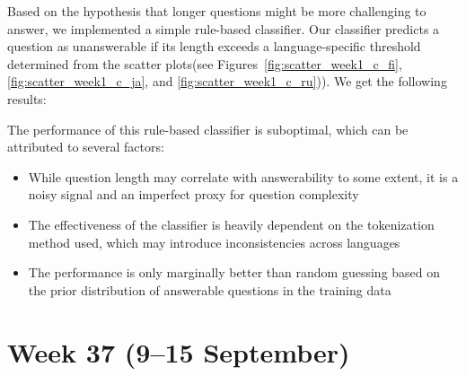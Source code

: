 \documentclass[11pt]{article}
\begin{document}
\begin{enumerate}
    Based on the hypothesis that longer questions might be more challenging to answer, we implemented a simple rule-based classifier. 
    Our classifier predicts a question as unanswerable if its length exceeds a language-specific threshold determined from the scatter plots(see Figures~\ref{fig:scatter_week1_c_fi}, \ref{fig:scatter_week1_c_ja}, and \ref{fig:scatter_week1_c_ru})). 
    We get the following results:

    \begin{table}[ht]
        \centering
        \caption{Performance metrics of the rule-based classifier on the validation set}
        \label{tab:classifier_performance}
    \end{table}

    The performance of this rule-based classifier is suboptimal, which can be attributed to several factors:
    \begin{itemize}
        \item While question length may correlate with answerability to some extent, it is a noisy signal and an imperfect proxy for question complexity
        \item The effectiveness of the classifier is heavily dependent on the tokenization method used, which may introduce inconsistencies across languages
        \item The performance is only marginally better than random guessing based on the prior distribution of answerable questions in the training data
    \end{itemize}

\end{enumerate}

\section{Week 37 (9--15 September)}
\label{sec:week37}
\end{document}
